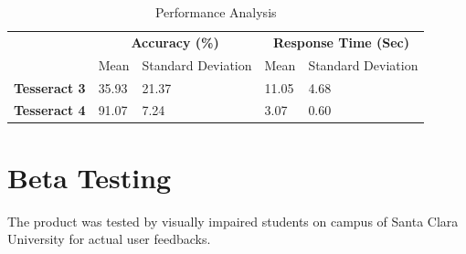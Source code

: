 		
\begin{table}[]
\centering
\caption{Performance Analysis}
\label{performanceAnalysis}
\begin{tabular}{l|l|l|l|l|}
\cline{2-5}
\multirow{2}{*}{}                          & \multicolumn{2}{c|}{\textbf{Accuracy (\%)}} & \multicolumn{2}{c|}{\textbf{Response Time (Sec)}} \\ \cline{2-5} 
                                           & Mean           & Standard Deviation         & Mean              & Standard Deviation            \\ \hline
\multicolumn{1}{|l|}{\textbf{Tesseract 3}} & 35.93          & 21.37                      & 11.05             & 4.68                          \\ \hline
\multicolumn{1}{|l|}{\textbf{Tesseract 4}} & 91.07          & 7.24                       & 3.07              & 0.60                          \\ \hline
\end{tabular}
\end{table}

	\section{Beta Testing}
	The product was tested by visually impaired students on campus of Santa Clara University for actual user feedbacks.